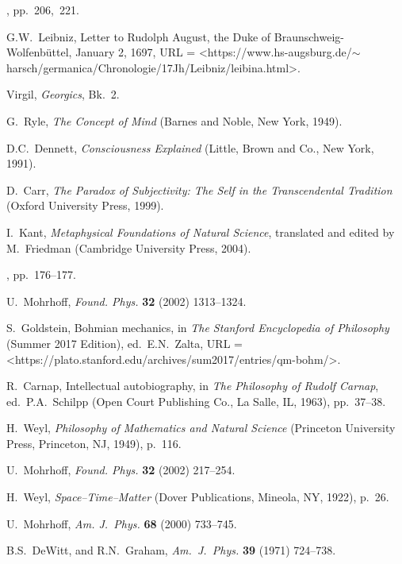 \documentclass[12pt]{article}
\begin{document}
\begin{thebibliography}{99}
 \cite{Falk2007}, pp.\ 206,~221.

 G.W.\ Leibniz, Letter to Rudolph August, the Duke of Braunschweig-Wolfenb\"uttel, January 2, 1697, URL = \textless https://www.hs-augsburg.de/$\sim$harsch/germanica/\break Chronologie/17Jh/Leibniz/lei\textunderscore bina.html\textgreater.

 Virgil, \emph{Georgics}, Bk.~2.

 G.\ Ryle, \textit{The Concept of Mind} (Barnes and Noble, New York, 1949).

 D.C.\ Dennett, \textit{Consciousness Explained} (Little, Brown and Co., New York, 1991).

 D.\ Carr, \textit{The Paradox of Subjectivity: The Self in the Transcendental Tradition} (Oxford University Press, 1999).

 I.\ Kant, \textit{Metaphysical Foundations of Natural Science}, translated and edited by M.\ Friedman (Cambridge University Press, 2004).

 \cite{vW}, pp.\ 176--177.

 U.\ Mohrhoff, \emph{Found. Phys.} \textbf{32} (2002) 1313--1324.

 S.\ Goldstein, Bohmian mechanics, in \textit{The Stanford Encyclopedia of Philosophy} (Summer 2017 Edition), ed.\ E.N.\ Zalta, URL = \textless https://plato.stanford.edu/archives/\break sum2017/entries/qm-bohm/\textgreater.

 R.\ Carnap, Intellectual autobiography, in \emph{The Philosophy of Rudolf Carnap}, ed.\ P.A.\ Schilpp (Open Court Publishing Co., La Salle, IL, 1963), pp.\ 37--38.

 H.\ Weyl, \emph{Philosophy of Mathematics and Natural Science} (Princeton University Press, Princeton, NJ, 1949), p.~116.

 U.\ Mohrhoff, \emph{Found. Phys.} \textbf{32} (2002) 217--254.

 H.\ Weyl, \textit{Space--Time--Matter} (Dover Publications, Mineola, NY, 1922), p.~26.

 U.\ Mohrhoff, \emph{Am. J.\ Phys.} \textbf{68} (2000) 733--745.

 B.S.\ DeWitt, and R.N.\ Graham, \textit{Am.\ J.\ Phys.} \textbf{39} (1971) 724--738.

\end{thebibliography}
\end{document}

